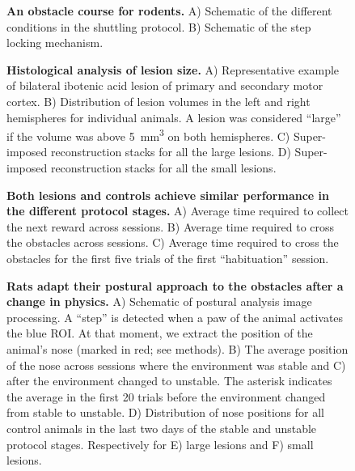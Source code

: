 
\begin{figure}
\centering

\caption{\textbf{An obstacle course for rodents.} A) Schematic of the different conditions in the shuttling protocol. B) Schematic of the step locking mechanism.}
\label{fig:assay}
\end{figure}

\begin{figure}
\centering

\caption{\textbf{Histological analysis of lesion size.} A) Representative example of bilateral ibotenic acid lesion of primary and secondary motor cortex. B) Distribution of lesion volumes in the left and right hemispheres for individual animals. A lesion was considered ``large'' if the volume was above \SI{5}{\milli\meter\cubed} on both hemispheres. C) Super-imposed reconstruction stacks for all the large lesions. D) Super-imposed reconstruction stacks for all the small lesions.}
\label{fig:histology}
\end{figure}

\begin{figure}
\centering

\caption{\textbf{Both lesions and controls achieve similar performance in the different protocol stages.} A) Average time required to collect the next reward across sessions. B) Average time required to cross the obstacles across sessions. C) Average time required to cross the obstacles for the first five trials of the first ``habituation'' session.}
\label{fig:learning}
\end{figure}

\begin{figure}
\centering

\caption{\textbf{Rats adapt their postural approach to the obstacles after a change in physics.} A) Schematic of postural analysis image processing. A ``step'' is detected when a paw of the animal activates the blue ROI. At that moment, we extract the position of the animal's nose (marked in red; see methods). B) The average position of the nose across sessions where the environment was stable and C) after the environment changed to unstable. The asterisk indicates the average in the first 20 trials before the environment changed from stable to unstable. D) Distribution of nose positions for all control animals in the last two days of the stable and unstable protocol stages. Respectively for E) large lesions and F) small lesions.}
\label{fig:posture}
\end{figure}

